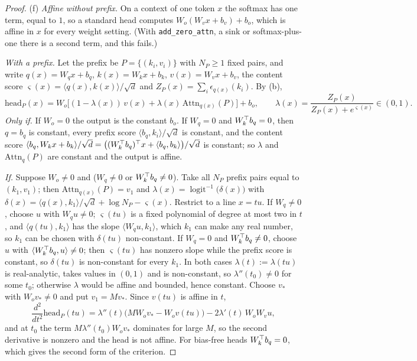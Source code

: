 \begin{proof}
(f) \emph{Affine without prefix.} On a context of one token $x$ the softmax has one term, equal to $1$, so a standard head
computes $W_o(W_vx+b_v)+b_o$, which is affine in $x$ for every weight setting. (With \texttt{add\_zero\_attn}, a sink or
softmax-plus-one there is a second term, and this fails.)

\emph{With a prefix.} Let the prefix be $P=\{(k_i,v_i)\}$ with $N_P\ge1$ fixed pairs, and write $q(x)=W_qx+b_q$,
$k(x)=W_kx+b_k$, $v(x)=W_vx+b_v$, the content score $\varsigma(x)=\langle q(x),k(x)\rangle/\sqrt d$ and
$Z_P(x)=\sum_i\epsilon_{q(x)}(k_i)$. By (b),
\begin{equation}\label{eq:C3-prefix-head}
\mathrm{head}_P(x)=W_o\big[(1-\lambda(x))\,v(x)+\lambda(x)\,\mathrm{Attn}_{q(x)}(P)\big]+b_o,\qquad
\lambda(x)=\frac{Z_P(x)}{Z_P(x)+e^{\varsigma(x)}}\in(0,1).
\end{equation}
\emph{Only if.} If $W_o=0$ the output is the constant $b_o$. If $W_q=0$ and $W_k^{\top} b_q=0$, then $q=b_q$ is constant, every prefix
score $\langle b_q,k_i\rangle/\sqrt d$ is constant, and the content score $\langle b_q,W_kx+b_k\rangle/\sqrt d=\big((W_k^{\top} b_q)^{\top}
x+\langle b_q,b_k\rangle\big)/\sqrt d$ is constant; so $\lambda$ and $\mathrm{Attn}_q(P)$ are constant and the output is affine.

\emph{If.} Suppose $W_o\ne0$ and ($W_q\ne0$ or $W_k^{\top} b_q\ne0$). Take all $N_P$ prefix pairs equal to $(k_1,v_1)$; then
$\mathrm{Attn}_{q(x)}(P)=v_1$ and $\lambda(x)=\operatorname{logit}^{-1}\big(\delta(x)\big)$ with
$\delta(x)=\langle q(x),k_1\rangle/\sqrt d+\log N_P-\varsigma(x)$. Restrict to a line $x=tu$. If $W_q\ne0$, choose $u$ with
$W_qu\ne0$; $\varsigma(tu)$ is a fixed polynomial of degree at most two in $t$, and $\langle q(tu),k_1\rangle$ has the slope
$\langle W_qu,k_1\rangle$, which $k_1$ can make any real number, so $k_1$ can be chosen with $\delta(tu)$ non-constant. If $W_q=0$ and
$W_k^{\top} b_q\ne0$, choose $u$ with $\langle W_k^{\top} b_q,u\rangle\ne0$; then $\varsigma(tu)$ has nonzero slope while the prefix score is
constant, so $\delta(tu)$ is non-constant for every $k_1$. In both cases $\lambda(t):=\lambda(tu)$ is real-analytic, takes values
in $(0,1)$ and is non-constant, so $\lambda''(t_0)\ne0$ for some $t_0$; otherwise $\lambda$ would be affine and bounded, hence
constant. Choose $v_*$ with $W_ov_*\ne0$ and put $v_1=Mv_*$. Since $v(tu)$ is affine in $t$,
\[\frac{d^2}{dt^2}\mathrm{head}_P(tu)=\lambda''(t)\big(MW_ov_*-W_ov(tu)\big)-2\lambda'(t)\,W_oW_vu ,\]
and at $t_0$ the term $M\lambda''(t_0)W_ov_*$ dominates for large $M$, so the second derivative is nonzero and the head is not
affine. For bias-free heads $W_k^{\top} b_q=0$, which gives the second form of the criterion.


\end{proof}
